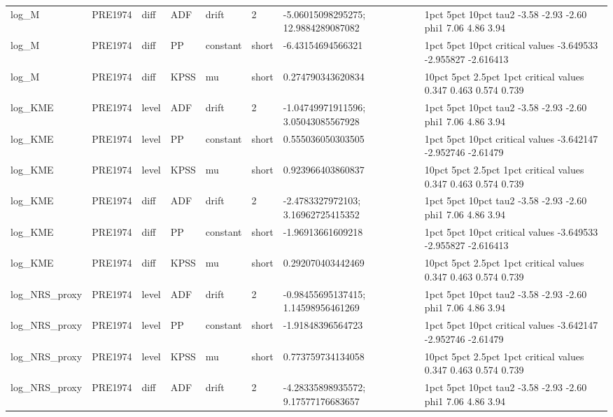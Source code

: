 \begin{tabular}{llllllll}
log\_M & PRE1974 & diff & ADF & drift & 2 & -5.06015098295275; 12.9884289087082 &       1pct  5pct 10pct tau2 -3.58 -2.93 -2.60 phi1  7.06  4.86  3.94 \\
log\_M & PRE1974 & diff & PP & constant & short & -6.43154694566321 &                      1pct      5pct     10pct critical values -3.649533 -2.955827 -2.616413 \\
log\_M & PRE1974 & diff & KPSS & mu & short & 0.274790343620834 &                 10pct  5pct 2.5pct  1pct critical values 0.347 0.463  0.574 0.739 \\
log\_KME & PRE1974 & level & ADF & drift & 2 & -1.04749971911596; 3.05043085567928 &       1pct  5pct 10pct tau2 -3.58 -2.93 -2.60 phi1  7.06  4.86  3.94 \\
log\_KME & PRE1974 & level & PP & constant & short & 0.555036050303505 &                      1pct      5pct    10pct critical values -3.642147 -2.952746 -2.61479 \\
log\_KME & PRE1974 & level & KPSS & mu & short & 0.923966403860837 &                 10pct  5pct 2.5pct  1pct critical values 0.347 0.463  0.574 0.739 \\
log\_KME & PRE1974 & diff & ADF & drift & 2 & -2.4783327972103; 3.16962725415352 &       1pct  5pct 10pct tau2 -3.58 -2.93 -2.60 phi1  7.06  4.86  3.94 \\
log\_KME & PRE1974 & diff & PP & constant & short & -1.96913661609218 &                      1pct      5pct     10pct critical values -3.649533 -2.955827 -2.616413 \\
log\_KME & PRE1974 & diff & KPSS & mu & short & 0.292070403442469 &                 10pct  5pct 2.5pct  1pct critical values 0.347 0.463  0.574 0.739 \\
log\_NRS\_proxy & PRE1974 & level & ADF & drift & 2 & -0.98455695137415; 1.14598956461269 &       1pct  5pct 10pct tau2 -3.58 -2.93 -2.60 phi1  7.06  4.86  3.94 \\
log\_NRS\_proxy & PRE1974 & level & PP & constant & short & -1.91848396564723 &                      1pct      5pct    10pct critical values -3.642147 -2.952746 -2.61479 \\
log\_NRS\_proxy & PRE1974 & level & KPSS & mu & short & 0.773759734134058 &                 10pct  5pct 2.5pct  1pct critical values 0.347 0.463  0.574 0.739 \\
log\_NRS\_proxy & PRE1974 & diff & ADF & drift & 2 & -4.28335898935572; 9.17577176683657 &       1pct  5pct 10pct tau2 -3.58 -2.93 -2.60 phi1  7.06  4.86  3.94 \\

\end{tabular}
